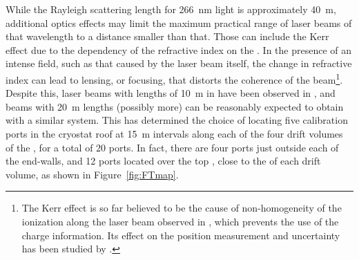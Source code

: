 




While the Rayleigh scattering length for \SI{266}{\nano\m}  light is approximately \SI{40}{\m}, additional optics effects may limit the maximum practical range of laser beams of that wavelength to a distance smaller than that. Those can include the Kerr effect  due to the dependency of the refractive index on the \efield. In the presence of an intense field, such as that caused by the laser beam itself, the change in refractive index can lead to lensing, or focusing, that distorts the coherence of the beam\footnote{The Kerr effect is so far believed to be the cause of non-homogeneity of the ionization along the laser beam observed in , which prevents the use of the charge information. Its effect on the position measurement and \efield uncertainty has been studied by .}. 
Despite this, laser beams with lengths of \SI{10}{\m} in  have been observed in , and beams with \SI{20}{\m} lengths (possibly more) can be reasonably expected to obtain with a similar system.
This has determined the choice of locating five calibration ports in the cryostat roof at \SI{15}{\m} intervals along each of the four drift volumes of the , for a total of \num{20} ports. In fact, there are four ports just outside each of the  end-walls, and \num{12} ports located over the top , close to the  of each drift volume, as shown in Figure~\ref{fig:FTmap}.



